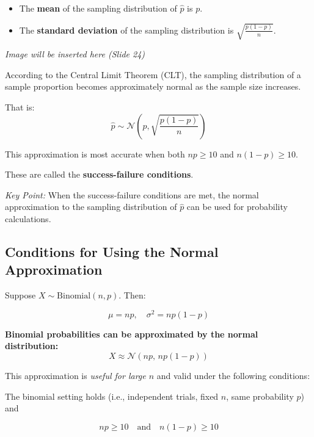 \begin{itemize}
  \item The \textbf{mean} of the sampling distribution of \( \hat{p} \) is \( p \).
  \item The \textbf{standard deviation} of the sampling distribution is \( \sqrt{ \frac{p(1 - p)}{n} } \).
\end{itemize}


\begin{center}
\textit{Image will be inserted here (Slide 24)}
\end{center}

According to the Central Limit Theorem (CLT), the sampling distribution of a sample proportion becomes approximately normal as the sample size increases.

That is:
\[
\hat{p} \sim \mathcal{N}\left(p, \sqrt{\frac{p(1 - p)}{n}}\right)
\]

This approximation is most accurate when both \( np \geq 10 \) and \( n(1 - p) \geq 10 \).

These are called the \textbf{success-failure conditions}.

\medskip

\textit{Key Point:} When the success-failure conditions are met, the normal approximation to the sampling distribution of \( \hat{p} \) can be used for probability calculations.
\subsection*{Conditions for Using the Normal Approximation}

\vspace{0.5em}

Suppose \( X \sim \text{Binomial}(n, p) \). Then:

\[
\mu = np, \quad \sigma^2 = np(1 - p)
\]

\medskip

\textbf{Binomial probabilities can be approximated by the normal distribution:}
\[
X \approx \mathcal{N}(np, \, np(1 - p))
\]

This approximation is \textit{useful for large \( n \)} and valid under the following conditions:

\begin{tcolorbox}[title=Standard Conditions,
  colback=blue!5, 
  colframe=blue!50!black, 
  coltitle=black,
  colbacktitle=blue!20, %
  fonttitle=\bfseries,
  sharp corners=south,
  boxrule=0.5pt,
  enhanced,
  width=\textwidth,
  breakable]
The binomial setting holds (i.e., independent trials, fixed \( n \), same probability \( p \)) and

\[
np \geq 10 \quad \text{and} \quad n(1 - p) \geq 10
\]
\end{tcolorbox}

